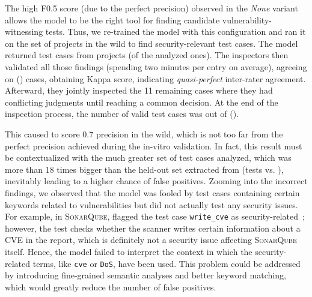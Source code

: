 The high F0.5 score (due to the perfect precision) observed in the \textit{None} variant allows the \finder model to be the right tool for finding candidate vulnerability-witnessing tests.
%
Thus, we re-trained the \finder model with this configuration and ran it on the set of \Java projects in the wild to find security-relevant test cases.
The model returned \invivoFindingResults test cases from \invivoFindingResultsProjects projects (\invivoFindingResultsProjectsPerc of the analyzed ones).
The inspectors then validated all those findings (spending two minutes per entry on average), agreeing on \invivoFindingAgreement (\invivoFindingAgreementPerc) cases, obtaining \invivoFindingKappa Kappa score, indicating \textit{quasi-perfect} inter-rater agreement.
Afterward, they jointly inspected the 11 remaining cases where they had conflicting judgments until reaching a common decision.
At the end of the inspection process, the number of valid test cases was \invivoFindingResultsCorrect out of \invivoFindingResults (\invivoFindingResultsCorrectPerc).

This caused \vuteco to score $0.7$ precision in the wild, which is not too far from the perfect precision achieved during the in-vitro validation.
In fact, this result must be contextualized with the much greater set of test cases \vuteco analyzed, which was more than 18 times bigger than the held-out set extracted from \VulforJ (\invivoTests tests vs. \evalFinderTrainTot), inevitably leading to a higher chance of false positives.
%
Zooming into the incorrect findings, we observed that the \finder model was fooled by test cases containing certain keywords related to vulnerabilities but did not actually test any security issues.
For example, in \textsc{SonarQube}, \vuteco flagged the test case \texttt{write\_cve} as security-related~\cite{sonarqube:example}; however, the test checks whether the scanner writes certain information about a CVE in the report, which is definitely not a security issue affecting \textsc{SonarQube} itself.
Hence, the \finder model failed to interpret the context in which the security-related terms, like \texttt{cve} or \texttt{DoS}, have been used.
%
This problem could be addressed by introducing fine-grained semantic analyses and better keyword matching, which would greatly reduce the number of false positives.



